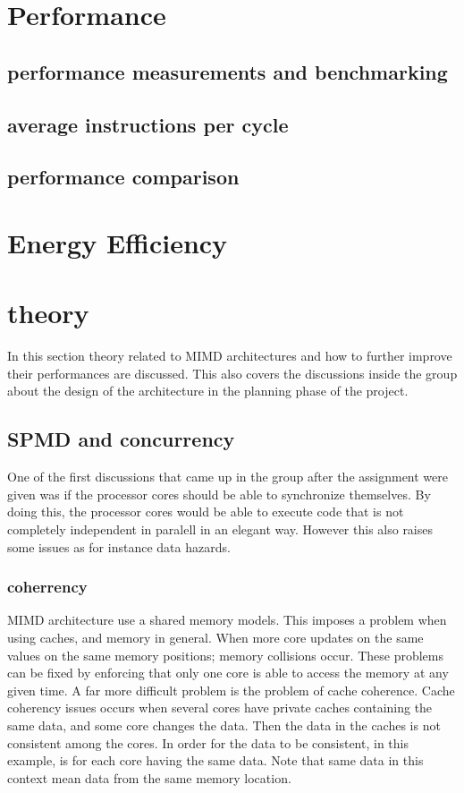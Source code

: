 \section{Performance}
\subsection{performance measurements and benchmarking}
\subsection{average instructions per cycle}
\subsection{performance comparison}


\section{Energy Efficiency}

\section{theory}
In this section theory related to MIMD architectures and how to further improve their performances are discussed.
This also covers the discussions inside the group about the design of the architecture in the planning phase of the project.
\subsection{SPMD and concurrency}
One of the first discussions that came up in the group after the assignment were given was if the processor cores should
be able to synchronize themselves. By doing this, the processor cores would be able to execute code that is not completely independent in paralell in an elegant way.
However this also raises some issues as for instance data hazards.

\subsubsection{coherrency}
MIMD architecture use a shared memory models. This imposes a problem when using caches, and memory in general. When more core updates on the same values on the same memory positions; memory collisions occur. These problems can be fixed by enforcing that only one core is able to access the memory at any given time. A far more difficult problem is the problem of cache coherence. Cache coherency issues occurs when several cores have private caches containing the same data, and some core changes the data. Then the data in the caches is not consistent among the cores. In order for the data to be consistent, in this example, is for each core having the same data. Note that same data in this context mean data from the same memory location. 

